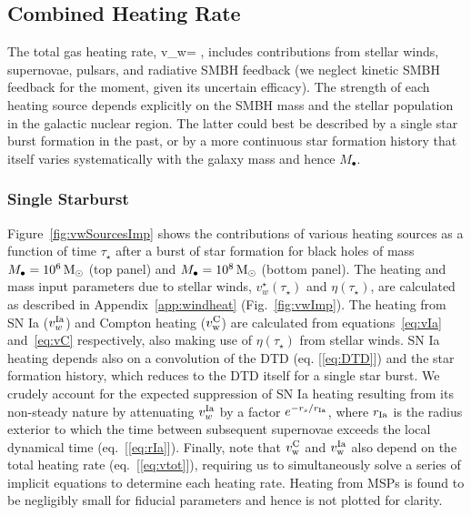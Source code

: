 \documentclass[usenatbib,fleqn]{mn2e}
\newcommand{\rs}{r_s}
\newcommand{\Mbh}[1][]{M_{\bullet#1}}
\newcommand{\rIa}{r_{\rm Ia}}
\newcommand{\vwO}{v_{w}}
\begin{document}
\subsection{Combined Heating Rate} 
\label{sec:combined}


The total gas heating rate, 
\be
\vwO = ,
\label{eq:vtot}
\ee
includes contributions from stellar winds, supernovae, pulsars, and radiative SMBH feedback (we neglect kinetic SMBH feedback for the moment, given its uncertain efficacy).  The strength of each heating source depends explicitly on the SMBH mass and the stellar population in the galactic nuclear region.  The latter could best be described by a single star burst formation in the past, or by a more continuous star formation history that itself varies systematically with the galaxy mass and hence $\Mbh$.

\subsubsection{Single Starburst}

Figure~\ref{fig:vwSourcesImp} shows the contributions of various heating sources as a function of time $\tau_{\star}$ after a burst of star formation for black holes of mass $\Mbh = 10^{6} \Msun$ (top panel) and $\Mbh = 10^{8} \Msun$ (bottom panel). The heating and mass input parameters due to stellar winds, $v_{w}^{\star}(\tau_{\star})$ and $\eta(\tau_{\star})$, are calculated as described in Appendix~\ref{app:windheat} (Fig.~\ref{fig:vwImp}).  The heating from SN Ia ($v_{w}^{\rm Ia}$) and Compton heating ($v_{\rm w}^{\rm C}$) are calculated from equations~\eqref{eq:vIa} and~\eqref{eq:vC} respectively, also making use of $\eta(\tau_{\star})$ from stellar winds.  SN Ia heating depends also on a convolution of the DTD (eq. [\ref{eq:DTD}]) and the star formation history, which reduces to the DTD itself for a single star burst.  We crudely account for the expected suppression of SN Ia heating resulting from its non-steady nature by attenuating $v_{w}^{\rm Ia}$ by a factor $e^{-\rs/\rIa}$, where $r_{\rm Ia}$ is the radius exterior to which the time between subsequent supernovae exceeds the local dynamical time (eq.~[\ref{eq:rIa}]).  Finally, note that $v_{\rm w}^{\rm C}$ and $v_{\rm w}^{\rm Ia}$ also depend on the total heating rate (eq.~[\ref{eq:vtot}]), requiring us to simultaneously solve a series of implicit equations to determine each heating rate.  Heating from MSPs is found to be negligibly small for fiducial parameters and hence is not plotted for clarity.  
\end{document}
